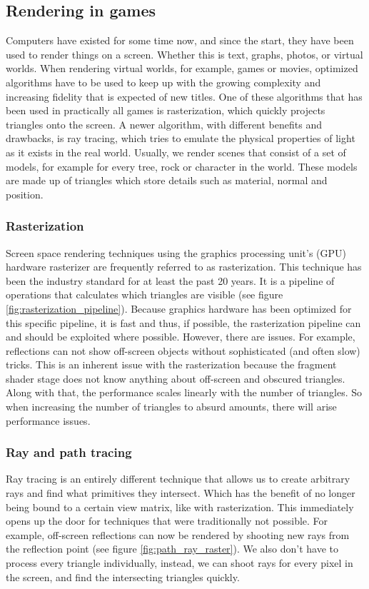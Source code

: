 \subsection{Rendering in games} \label{related_work:rendering}
Computers have existed for some time now, and since the start, they have been used to render things on a screen. Whether this is text, graphs, photos, or virtual worlds. When rendering virtual worlds, for example, games or movies, optimized algorithms have to be used to keep up with the growing complexity and increasing fidelity that is expected of new titles. One of these algorithms that has been used in practically all games is rasterization, which quickly projects triangles onto the screen. A newer algorithm, with different benefits and drawbacks, is ray tracing, which tries to emulate the physical properties of light as it exists in the real world. Usually, we render scenes that consist of a set of models, for example for every tree, rock or character in the world. These models are made up of triangles which store details such as material, normal and position.


\subsubsection{Rasterization} \label{related_work:rendering:rasterization}
Screen space rendering techniques using the graphics processing unit's (GPU) hardware rasterizer are frequently referred to as rasterization. This technique has been the industry standard for at least the past 20 years. It is a pipeline of operations that calculates which triangles are visible (see figure \ref{fig:rasterization_pipeline}). Because graphics hardware has been optimized for this specific pipeline, it is fast and thus, if possible, the rasterization pipeline can and should be exploited where possible. However, there are issues. For example, reflections can not show off-screen objects without sophisticated (and often slow) tricks. This is an inherent issue with the rasterization because the fragment shader stage does not know anything about off-screen and obscured triangles. Along with that, the performance scales linearly with the number of triangles. So when increasing the number of triangles to absurd amounts, there will arise performance issues.

\subsubsection{Ray and path tracing} \label{related_work:rendering:ray_tracing}
Ray tracing is an entirely different technique that allows us to create arbitrary rays and find what primitives they intersect. Which has the benefit of no longer being bound to a certain view matrix, like with rasterization. This immediately opens up the door for techniques that were traditionally not possible. For example, off-screen reflections can now be rendered by shooting new rays from the reflection point (see figure \ref{fig:path_ray_raster}). We also don't have to process every triangle individually, instead, we can shoot rays for every pixel in the screen, and find the intersecting triangles quickly.

